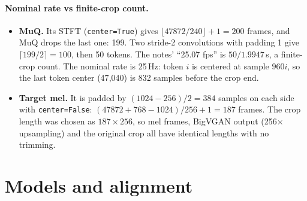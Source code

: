 \documentclass[10pt,letterpaper]{article}
\begin{document}
\paragraph{Nominal rate vs finite-crop count.}
\begin{itemize}
\item \textbf{MuQ.} Its STFT (\texttt{center=True}) gives $\lfloor 47872/240\rfloor+1=200$ frames, and MuQ drops the last one: 199. Two stride-2 convolutions with padding 1 give $\lceil 199/2\rceil=100$, then 50 tokens. The notes' ``25.07 fps'' is $50/1.9947$\,s, a finite-crop count. The nominal rate is 25\,Hz: token $i$ is centered at sample $960i$, so the last token center (47{,}040) is 832 samples before the crop end.
\item \textbf{Target mel.} It is padded by $(1024-256)/2=384$ samples on each side with \texttt{center=False}: $(47872+768-1024)/256+1=187$ frames. The crop length was chosen as $187\times256$, so mel frames, BigVGAN output (256$\times$ upsampling) and the original crop all have identical lengths with no trimming.
\end{itemize}


\section{Models and alignment}
\label{sec:models}
\end{document}
